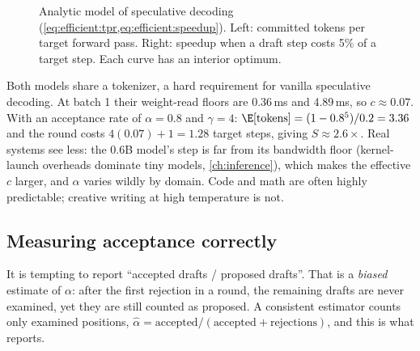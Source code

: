 \begin{figure}[t]
\centering
{}
\caption{Analytic model of speculative decoding (\cref{eq:efficient:tpr,eq:efficient:speedup}).
Left: committed tokens per target forward pass. Right: speedup when a draft step costs 5\%
of a target step. Each curve has an interior optimum.}
\label{fig:efficient:spec-curves}
\end{figure}

\begin{napkinmath}
Both models share a tokenizer, a hard requirement for vanilla speculative decoding. At
batch 1 their weight-read floors are 0.36\,ms and 4.89\,ms, so $c\approx 0.07$. With an
acceptance rate of $\alpha=0.8$ and $\gamma=4$:
$\E[\text{tokens}]=(1-0.8^5)/0.2=3.36$ and the round costs $4(0.07)+1=1.28$ target
steps, giving $S\approx 2.6\times$. Real systems see less: the 0.6B model's step is far
from its bandwidth floor (kernel-launch overheads dominate tiny models, \cref{ch:inference}),
which makes the effective $c$ larger, and $\alpha$ varies wildly by domain. Code and math
are often highly predictable; creative writing at high temperature is not.
\end{napkinmath}

\subsection{Measuring acceptance correctly}
It is tempting to report ``accepted drafts / proposed drafts''. That is a \emph{biased}
estimate of $\alpha$: after the first rejection in a round, the remaining drafts are
never examined, yet they are still counted as proposed. A consistent estimator counts
only examined positions,
$\hat\alpha=\text{accepted}/(\text{accepted}+\text{rejections})$, and this is what
 reports.

